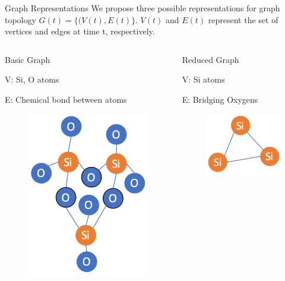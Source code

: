 \begin{frame}[t]{Graph Representations}
We propose three possible representations for graph topology $G(t)=\{(V(t),E(t)\}$.
$V(t)$ and $E(t)$ represent the set of vertices and edges at time t, respectively.

 \begin{columns}[t]
 
   \begin{block}{Basic Graph}
   \begin{itemize}
   \begin{footnotesize}
       \item V: Si, O atoms
       \item E: Chemical bond between atoms
    \end{footnotesize}
    \end{itemize}
    \begin{figure}
	    \centering
        \includegraphics[width=.5\textwidth]{images/basic.png}
	\end{figure}
   \end{block}
   
   \begin{block}{Reduced Graph}
   \begin{itemize}
   \begin{footnotesize}
       \item V: Si atoms
       \item E: Bridging Oxygens
    \end{footnotesize}
   \end{itemize}
    \begin{figure}
	    \centering
        \includegraphics[width=.5\textwidth]{images/reduced.png}
	\end{figure}
   \end{block}
   

\end{columns}
\end{frame}
